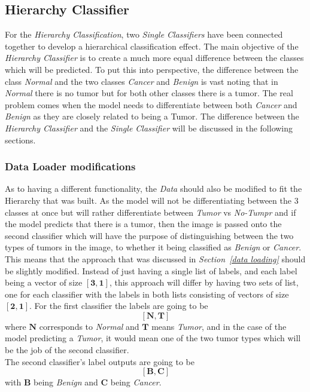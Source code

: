 \documentclass[12pt]{extarticle}
\begin{document}
	
	\subsection{Hierarchy Classifier}
	
	For the \emph{Hierarchy Classification}, two \emph{Single Classifiers} have been connected together to develop a hierarchical classification effect. The main objective of the \emph{Hierarchy Classifier} is to create a much more equal difference between the classes which will be predicted. To put this into perspective, the difference between the class \emph{Normal} and the two classes \emph{Cancer} and \emph{Benign} is vast noting that in \emph{Normal} there is no tumor but for both other classes there is a tumor. The real problem comes when the model needs to differentiate between both \emph{Cancer} and \emph{Benign} as they are closely related to being a Tumor. The difference between the \emph{Hierarchy Classifier} and the \emph{Single Classifier} will be discussed in the following sections.
	
	\subsubsection{Data Loader modifications}\label{modification}
	As to having a different functionality, the \emph{Data} should also be modified to fit the Hierarchy that was built. As the model will not be differentiating between the 3 classes at once but will rather differentiate between \emph{Tumor} vs \emph{No-Tumpr} and if the model predicts that there is a tumor, then the image is passed onto the second classifier which will have the purpose of distinguishing between the two types of tumors in the image, to whether it being classified as \emph{Benign} or \emph{Cancer}.\\
	This means that the approach that was discussed in \emph{Section~\ref{data loading}} should be slightly modified. Instead of just having a single list of labels, and each label being a vector of size $\bm{[3, 1]}$, this approach will differ by having two sets of list, one for each classifier with the labels in both lists consisting of vectors of size $\bm{[2, 1]}$. For the first classifier the labels are going to be 
	\begin{equation}
		\bm{[N, T]}
	\end{equation}
	where $\bm{N}$ corresponds to \emph{Normal} and $\bm{T}$ means \emph{Tumor}, and in the case of the model predicting a \emph{Tumor}, it would mean one of the two tumor types which will be the job of the second classifier.\\
	The second classifier's label outputs are going to be
	\begin{equation}
		\bm{[B, C]}
	\end{equation}
	with $\bm{B}$ being \emph{Benign} and $\bm{C}$ being \emph{Cancer}.\\
	
\end{document}
